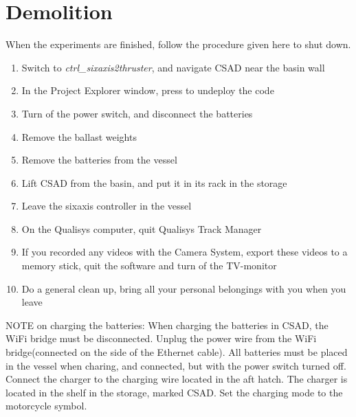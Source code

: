 \chapter{Demolition}
When the experiments are finished, follow the procedure given here to shut down. 
\begin{enumerate}
	\item Switch to \textit{ctrl\_sixaxis2thruster}, and navigate CSAD near the basin wall
	\item In the Project Explorer window, press to undeploy the code
	\item Turn of the power switch, and disconnect the batteries
	\item Remove the ballast weights
	\item Remove the batteries from the vessel
	\item Lift CSAD from the basin, and put it in its rack in the storage
	\item Leave the sixaxis controller in the vessel
	\item On the Qualisys computer, quit Qualisys Track Manager
	\item If you recorded any videos with the Camera System, export these videos to a memory stick, quit the software and turn of the TV-monitor
	\item Do a general clean up, bring all your personal belongings with you when you leave
\end{enumerate}
NOTE on charging the batteries: When charging the batteries in CSAD, the WiFi bridge must be disconnected. Unplug the power wire from the WiFi bridge(connected on the side of the Ethernet cable). All batteries must be placed in the vessel when charing, and connected, but with the power switch turned off. Connect the charger to the charging wire located in the aft hatch. The charger is located in the shelf in the storage, marked CSAD. Set the charging mode to the motorcycle symbol. 